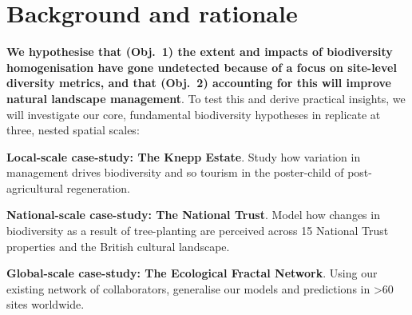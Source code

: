 





\section*{\Large Background and rationale}

\blindtext

\blindtext

\textbf{We hypothesise that (Obj.\ 1) the extent and impacts of biodiversity homogenisation have gone undetected because of a focus on site-level diversity metrics, and that (Obj.\ 2) accounting for this will improve natural landscape management}. To test this and derive practical insights, we will investigate our core, fundamental biodiversity hypotheses in replicate at three, nested spatial scales:

\begin{mdframed}[outerlinewidth=1, roundcorner=10pt, backgroundcolor=blue!20, innertopmargin=5pt, leftmargin=0, rightmargin=0, splittopskip=\topskip, ntheorem=true]
  \textbf{Local-scale case-study: The Knepp Estate}. Study how variation in management drives biodiversity and so tourism in the poster-child of post-agricultural regeneration.
\end{mdframed}
\vspace{-.2in}
\begin{mdframed}[outerlinewidth=1, roundcorner=10pt, backgroundcolor=teal!20, innertopmargin=5pt, leftmargin=0, rightmargin=0, splittopskip=\topskip, ntheorem=true]
  \textbf{National-scale case-study: The National Trust}. Model how changes in biodiversity as a result of tree-planting are perceived across 15 National Trust properties and the British cultural landscape.
\end{mdframed}
\vspace{-.2in}
\begin{mdframed}[outerlinewidth=1, roundcorner=10pt, backgroundcolor=red!20, innertopmargin=5pt, leftmargin=0, rightmargin=0, splittopskip=\topskip, ntheorem=true]
  \textbf{Global-scale case-study: The Ecological Fractal Network}. Using our existing network of collaborators, generalise our models and predictions in >60 sites worldwide.
\end{mdframed}

\vspace{-12pt}
\blindtext

